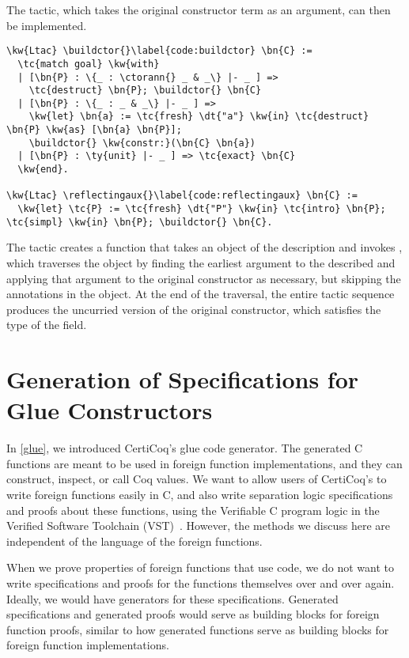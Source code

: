 The  tactic, which takes the original constructor term as an argument, can then be implemented. 


\begin{Verbatim}
\kw{Ltac} \buildctor{}\label{code:buildctor} \bn{C} :=
  \tc{match goal} \kw{with}
  | [\bn{P} : \{_ : \ctorann{} _ & _\} |- _ ] =>
    \tc{destruct} \bn{P}; \buildctor{} \bn{C}
  | [\bn{P} : \{_ : _ & _\} |- _ ] =>
    \kw{let} \bn{a} := \tc{fresh} \dt{"a"} \kw{in} \tc{destruct} \bn{P} \kw{as} [\bn{a} \bn{P}];
    \buildctor{} \kw{constr:}(\bn{C} \bn{a})
  | [\bn{P} : \ty{unit} |- _ ] => \tc{exact} \bn{C}
  \kw{end}.

\kw{Ltac} \reflectingaux{}\label{code:reflectingaux} \bn{C} :=
  \kw{let} \tc{P} := \tc{fresh} \dt{"P"} \kw{in} \tc{intro} \bn{P}; \tc{simpl} \kw{in} \bn{P}; \buildctor{} \bn{C}.
\end{Verbatim}

The  tactic creates a function that takes an \args{} object of the \reified{} description and invokes \buildctor{}, which traverses the \args{} object by finding the earliest argument to the described \constructor{} and applying that argument to the original constructor as necessary, but skipping the annotations in the \args{} object. At the end of the traversal, the entire tactic sequence produces the uncurried version of the original constructor, which satisfies the type of the \ctorreflected{} field.

\section{Generation of Specifications for Glue Constructors}
\label{genspecctor}

In \autoref{glue}, we introduced CertiCoq's \gls{glue code} generator. The generated C functions are meant to be used in \gls{foreign function} implementations, and they can construct, inspect, or call Coq values. 
We want to allow users of CertiCoq's \FFI{} to write \gls{foreign function}s easily in C, and also write separation logic specifications and proofs about these functions, using the Verifiable C program logic in the Verified Software Toolchain (VST)~\cite{appel2014program}. However, the methods we discuss here are independent of the language of the foreign functions.

When we prove properties of \gls{foreign function}s that use \glue{} code, we do not want to write specifications and proofs for the \glue{} functions themselves over and over again. Ideally, we would have generators for these specifications.  Generated specifications and generated proofs would serve as building blocks for \gls{foreign function} proofs, similar to how generated \glue{} functions serve as building blocks for \gls{foreign function} implementations.

